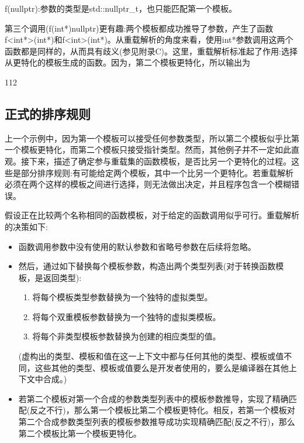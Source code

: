 f(nullptr):参数的类型是std::nullptr\_t，也只能匹配第一个模板。

第三个调用(f(int*)nullptr)更有趣:两个模板都成功推导了参数，产生了函数f<int*>(int*)和f<int>(int*)。从重载解析的角度来看，使用int*参数调用这两个函数都是同样的，从而具有歧义(参见附录C)。这里，重载解析标准起了作用:选择从更特化的模板生成的函数。因为，第二个模板更特化，所以输出为

\begin{shell}
112
\end{shell}

\subsection{正式的排序规则}

上一个示例中，因为第一个模板可以接受任何参数类型，所以第二个模板似乎比第一个模板更特化，而第二个模板只接受指针类型。然而，其他例子并不一定如此直观。接下来，描述了确定参与重载集的函数模板，是否比另一个更特化的过程。这些是部分排序规则:有可能给定两个模板，其中一个比另一个更特化。若重载解析必须在两个这样的模板之间进行选择，则无法做出决定，并且程序包含一个模糊错误。

假设正在比较两个名称相同的函数模板，对于给定的函数调用似乎可行。重载解析的决策如下:

\begin{itemize}
\item 
函数调用参数中没有使用的默认参数和省略号参数在后续将忽略。

\item 
然后，通过如下替换每个模板参数，构造出两个类型列表(对于转换函数模板，是返回类型):

\begin{enumerate}
\item 
将每个模板类型参数替换为一个独特的虚拟类型。

\item 
将每个双重模板参数替换为一个独特的虚拟类模板。

\item 
将每个非类型模板参数替换为创建的相应类型的值。
\end{enumerate}

(虚构出的类型、模板和值在这一上下文中都与任何其他的类型、模板或值不同，这些其他的类型、模板或值要么是开发者使用的，要么是编译器在其他上下文中合成。)

\item 
若第二个模板对第一个合成的参数类型列表中的模板参数推导，实现了精确匹配(反之不行)，那么第一个模板比第二个模板更特化。相反，若第一个模板对第二个合成参数类型列表的模板参数推导成功实现精确匹配(反之不行)，那么第二个模板比第一个模板更特化。
\end{itemize}


